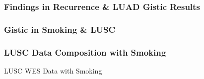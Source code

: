 \documentclass{beamer}
\begin{document}
    \begin{frame}
        \frametitle{Findings in Recurrence \& LUAD Gistic Results}
    \end{frame}

    \subsubsection{Gistic in Smoking \& LUSC}
    \begin{frame}
        \frametitle{LUSC Data Composition with Smoking}

        \begin{table}
            \caption{LUSC WES Data with Smoking}
            \resizebox{!}{0.3 \textheight}
            {}
        \end{table}
    \end{frame}
\end{document}
